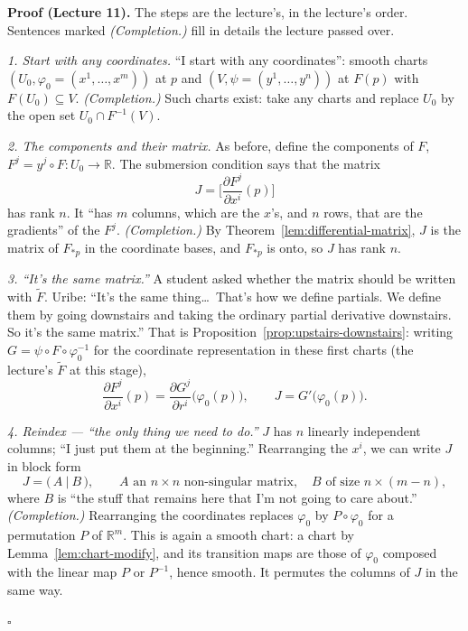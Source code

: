 \documentclass[11pt]{report}
\renewenvironment{proof}[1][Proof]{\noindent\textbf{#1.} }{\hfill$\square$\par\vspace{5pt}}
\begin{document}
\begin{proof}[Proof (Lecture 11)]
The steps are the lecture's, in the lecture's order. Sentences marked \textit{(Completion.)} fill in details the lecture passed over.

\emph{1. Start with any coordinates.} ``I start with any coordinates'': smooth charts $(U_0, \varphi_0 = (x^1, \ldots, x^m))$ at $p$ and $(V, \psi = (y^1, \ldots, y^n))$ at $F(p)$ with $F(U_0) \subseteq V$. \textit{(Completion.)} Such charts exist: take any charts and replace $U_0$ by the open set $U_0 \cap F^{-1}(V)$.

\emph{2. The components and their matrix.} As before, define the components of $F$, $F^j = y^j \circ F : U_0 \to \mathbb{R}$. The submersion condition says that the matrix
\[
J = \Big[\frac{\partial F^j}{\partial x^i}(p)\Big]
\]
has rank $n$. It ``has $m$ columns, which are the $x$'s, and $n$ rows, that are the gradients'' of the $F^j$. \textit{(Completion.)} By Theorem~\ref{lem:differential-matrix}, $J$ is the matrix of $F_{*p}$ in the coordinate bases, and $F_{*p}$ is onto, so $J$ has rank $n$.

\emph{3. ``It's the same matrix.''} A student asked whether the matrix should be written with $\tilde F$. Uribe: ``It's the same thing\ldots\ That's how we define partials. We define them by going downstairs and taking the ordinary partial derivative downstairs. So it's the same matrix.'' That is Proposition~\ref{prop:upstairs-downstairs}: writing $G = \psi \circ F \circ \varphi_0^{-1}$ for the coordinate representation in these first charts (the lecture's $\tilde F$ at this stage),
\[
\frac{\partial F^j}{\partial x^i}(p) = \frac{\partial G^j}{\partial r^i}\big(\varphi_0(p)\big), \qquad J = G'\big(\varphi_0(p)\big).
\]

\emph{4. Reindex --- ``the only thing we need to do.''} $J$ has $n$ linearly independent columns; ``I just put them at the beginning.'' Rearranging the $x^i$, we can write $J$ in block form
\[
J = \big(\, A \ \big|\ B \,\big), \qquad A \text{ an } n \times n \text{ non-singular matrix}, \quad B \text{ of size } n \times (m - n),
\]
where $B$ is ``the stuff that remains here that I'm not going to care about.'' \textit{(Completion.)} Rearranging the coordinates replaces $\varphi_0$ by $P \circ \varphi_0$ for a permutation $P$ of $\mathbb{R}^m$. This is again a smooth chart: a chart by Lemma~\ref{lem:chart-modify}, and its transition maps are those of $\varphi_0$ composed with the linear map $P$ or $P^{-1}$, hence smooth. It permutes the columns of $J$ in the same way.


\end{proof}
\end{document}
